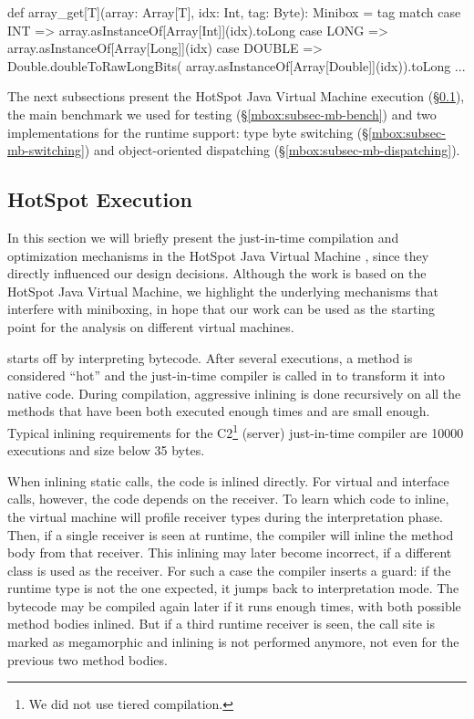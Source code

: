 \begin{lstlisting-nobreak}
 def array_get[T](array: Array[T], idx: Int, tag: Byte): Minibox = tag match {
   case INT =>     
     array.asInstanceOf[Array[Int]](idx).toLong
   case LONG =>    
     array.asInstanceOf[Array[Long]](idx)
   case DOUBLE =>  Double.doubleToRawLongBits(
     array.asInstanceOf[Array[Double]](idx)).toLong
   ...
 }
\end{lstlisting-nobreak}

 The next subsections present the HotSpot Java Virtual Machine execution (\S\ref{mbox:subsec-mb-jvm}), the main benchmark we used for testing (\S\ref{mbox:subsec-mb-bench}) and two implementations for the runtime support: type byte switching (\S\ref{mbox:subsec-mb-switching}) and object-oriented dispatching (\S\ref{mbox:subsec-mb-dispatching}).

\subsection{HotSpot Execution}
\label{mbox:subsec-mb-jvm}

 In this section we will briefly present the just-in-time compilation and optimization me\-cha\-ni\-sms in the HotSpot Java Virtual Machine \cite{hotspot-c1, hotspot-c2}, since they directly influenced our design decisions. Although the work is based on the HotSpot Java Virtual Machine, we highlight the underlying mechanisms that interfere with miniboxing, in hope that our work can be used as the starting point for the a\-na\-ly\-sis on different virtual machines. %

 starts off by interpreting bytecode. After several executions, a method is considered ``hot'' and the just-in-time compiler is called in to transform it into native code. During compilation, aggressive inlining is done recursively on all the methods that have been both executed enough times and are small enough. Typical inlining requirements for the C2\footnote{We did not use tiered compilation.} (server) just-in-time compiler are 10000 executions and size below 35 bytes.

When inlining static calls, the code is inlined directly. For virtual and interface calls, however, the code depends on the receiver. To learn which code to inline, the virtual machine will profile receiver types during the interpretation phase. Then, if a single receiver is seen at runtime, the compiler will inline the method body from that receiver. This inlining may later become incorrect, if a different class is used as the receiver. For such a case the compiler inserts a guard: if the runtime type is not the one expected, it jumps back to interpretation mode. The bytecode may be compiled again later if it runs enough times, with both possible method bodies inlined. But if a third runtime receiver is seen, the call site is marked as megamorphic and inlining is not performed anymore, not even for the previous two method bodies.

